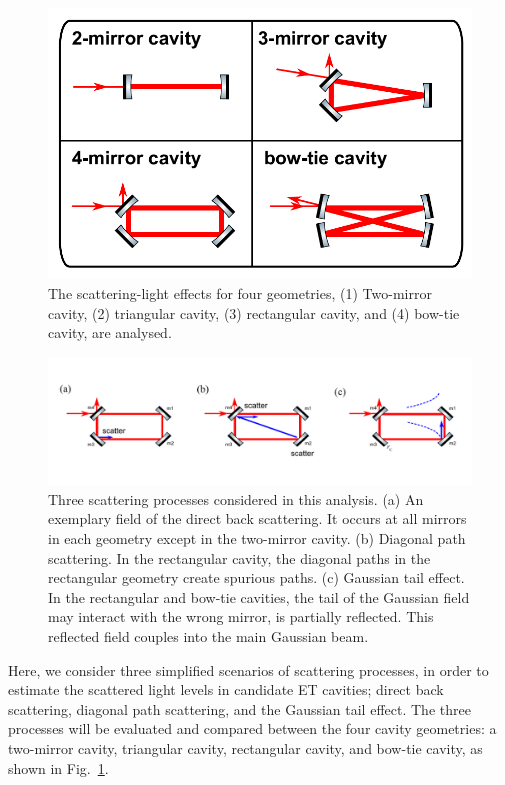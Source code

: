 \begin{figure}
\centering
\includegraphics[scale =0.6]{./Sec_Optics/cavity-designs.pdf}
\caption{The scattering-light effects for four geometries,
(1) Two-mirror cavity, (2) triangular cavity, (3) rectangular cavity,
and (4) bow-tie cavity, are analysed.}
\label{fig:new1}
\end{figure}

\begin{figure}
\centering
\includegraphics[scale =1]{./Sec_Optics/process.pdf}
\caption{Three scattering processes considered in this analysis.
(a) An exemplary field of the direct back scattering. It occurs at all mirrors
in each geometry except in the two-mirror cavity.
(b) Diagonal path scattering. In the rectangular cavity, the diagonal paths
in the rectangular geometry create spurious paths.
(c) Gaussian tail effect. In the rectangular and bow-tie cavities,
the tail of the Gaussian field may interact
with the wrong mirror, is partially reflected.
This reflected field couples into the main Gaussian beam. }
\label{fig:process}
\end{figure}


Here, we consider three simplified scenarios of scattering processes,
in order to estimate the scattered light levels in candidate ET cavities;
direct back scattering, diagonal path scattering,
and the Gaussian tail effect.
The three processes will be evaluated and compared between the four
cavity geometries:
a two-mirror cavity, triangular cavity, rectangular cavity, and bow-tie cavity,
as shown in Fig.~\ref{fig:new1}.

